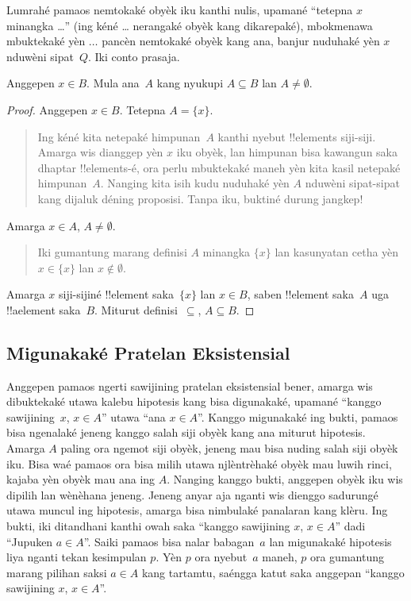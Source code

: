 \documentclass[../../../include/open-logic-section]{subfiles}
\begin{document}
Lumrahé pamaos nemtokaké obyèk iku kanthi nulis,
upamané ``tetepna $x$ minangka \dots'' (ing kéné \dots{}
nerangaké obyèk kang dikarepaké), mbokmenawa mbuktekaké
yèn $\dots$ pancèn nemtokaké obyèk kang ana, banjur nuduhaké
yèn $x$ nduwèni sipat~$Q$. Iki conto prasaja.

\begin{prop}
  Anggepen $x \in B$. Mula ana~$A$ kang nyukupi
  $A \subseteq B$ lan $A \neq \emptyset$.
\end{prop}

\begin{proof}
  Anggepen $x \in B$. Tetepna $A = \{x\}$.
  \begin{quote}
    Ing kéné kita netepaké himpunan~$A$ kanthi nyebut
    !!{element}s siji-siji. Amarga wis dianggep yèn $x$ iku obyèk,
    lan himpunan bisa kawangun saka dhaptar !!{element}s-é,
    ora perlu mbuktekaké maneh yèn kita kasil netepaké
    himpunan~$A$. Nanging kita isih kudu nuduhaké yèn $A$
    nduwèni sipat-sipat kang dijaluk déning proposisi.
    Tanpa iku, buktiné durung jangkep!{}
  \end{quote}
  Amarga $x \in A$, $A \neq \emptyset$.
  \begin{quote}
    Iki gumantung marang definisi $A$ minangka $\{x\}$ lan
    kasunyatan cetha yèn $x \in \{x\}$ lan $x \notin \emptyset$.
  \end{quote}
  Amarga $x$ siji-sijiné !!{element} saka~$\{x\}$ lan
  $x \in B$, saben !!{element} saka~$A$ uga !!a{element}
  saka~$B$. Miturut definisi~$\subseteq$, $A \subseteq B$.
\end{proof}

\subsection{Migunakaké Pratelan Eksistensial}

Anggepen pamaos ngerti sawijining pratelan eksistensial
bener, amarga wis dibuktekaké utawa kalebu hipotesis kang bisa
digunakaké, upamané ``kanggo sawijining~$x$, $x \in A$'' utawa
``ana $x \in A$''. Kanggo migunakaké ing bukti, pamaos
bisa ngenalaké jeneng kanggo salah siji obyèk kang ana miturut
hipotesis. Amarga $A$ paling ora ngemot siji obyèk, jeneng mau
bisa nuding salah siji obyèk iku. Bisa waé pamaos ora bisa
milih utawa njlèntrèhaké obyèk mau luwih rinci, kajaba yèn
obyèk mau ana ing $A$. Nanging kanggo bukti, anggepen obyèk
iku wis dipilih lan wènèhana jeneng. Jeneng anyar aja nganti
wis dienggo sadurungé utawa muncul ing hipotesis, amarga bisa
nimbulaké panalaran kang klèru. Ing bukti, iki ditandhani
kanthi owah saka ``kanggo sawijining $x$, $x \in A$'' dadi
``Jupuken $a \in A$''. Saiki pamaos bisa nalar babagan~$a$
lan migunakaké hipotesis liya nganti tekan kesimpulan $p$.
Yèn $p$ ora nyebut~$a$ maneh, $p$ ora gumantung
marang pilihan saksi $a \in A$ kang tartamtu,
saéngga katut saka anggepan
``kanggo sawijining $x$, $x \in A$''.
\end{document}
